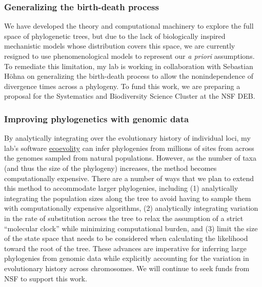 \subsubsection*{Generalizing the birth-death process}
We have developed the theory and computational machinery to explore
the full space of phylogenetic trees, but due to the lack
of biologically inspired mechanistic models whose distribution covers
this space, we are currently resigned to use phenomenological models
to represent our \emph{a priori} assumptions.
To remediate this limitation, my lab is working in collaboration with Sebastian
H{\"o}hna on generalizing the birth-death process to allow the nonindependence
of divergence times across a phylogeny.
To fund this work, we are preparing a proposal for the Systematics and
Biodiversity Science Cluster at the NSF DEB. 

\subsubsection*{Improving phylogenetics with genomic data}
By analytically integrating over the evolutionary history of individual loci,
my lab's software
\href{http://phyletica.org/ecoevolity/}{ecoevolity}
can infer phylogenies from millions of sites from across the genomes sampled
from natural populations.
However, as the number of taxa (and thus the size of the phylogeny) increases,
the method becomes computationally expensive.
There are a number of ways that we plan to extend this method to accommodate
larger phylogenies, including
(1) analytically integrating the population sizes along the tree to
avoid having to sample them with computationally expensive algorithms,
(2) analytically integrating variation in the rate of substitution
across the tree to relax the assumption of a strict ``molecular clock'' while
minimizing computational burden,
and
(3) limit the size of the state space that needs to be considered when
calculating the likelihood toward the root of the tree.
These advances are imperative for inferring large phylogenies from genomic data
while explicitly accounting for the variation in evolutionary history across
chromosomes.
We will continue to seek funds from NSF to support this work.

